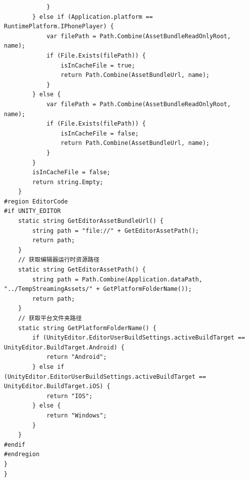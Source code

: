\documentclass[9pt, b5paper]{article}
\begin{document}
\begin{verbatim}
            }
        } else if (Application.platform == RuntimePlatform.IPhonePlayer) {
            var filePath = Path.Combine(AssetBundleReadOnlyRoot, name);
            if (File.Exists(filePath)) {
                isInCacheFile = true;
                return Path.Combine(AssetBundleUrl, name);
            }
        } else {
            var filePath = Path.Combine(AssetBundleReadOnlyRoot, name);
            if (File.Exists(filePath)) {
                isInCacheFile = false;
                return Path.Combine(AssetBundleUrl, name);
            }
        }
        isInCacheFile = false;
        return string.Empty;
    }
#region EditorCode
#if UNITY_EDITOR
    static string GetEditorAssetBundleUrl() {
        string path = "file://" + GetEditorAssetPath();
        return path;
    }
    // 获取编辑器运行时资源路径
    static string GetEditorAssetPath() {
        string path = Path.Combine(Application.dataPath, "../TempStreamingAssets/" + GetPlatformFolderName());
        return path;
    }
    // 获取平台文件夹路径
    static string GetPlatformFolderName() {
        if (UnityEditor.EditorUserBuildSettings.activeBuildTarget == UnityEditor.BuildTarget.Android) {
            return "Android";
        } else if (UnityEditor.EditorUserBuildSettings.activeBuildTarget == UnityEditor.BuildTarget.iOS) {
            return "IOS";
        } else {
            return "Windows";
        }
    }
#endif
#endregion
}
}
\end{verbatim}
\end{document}
